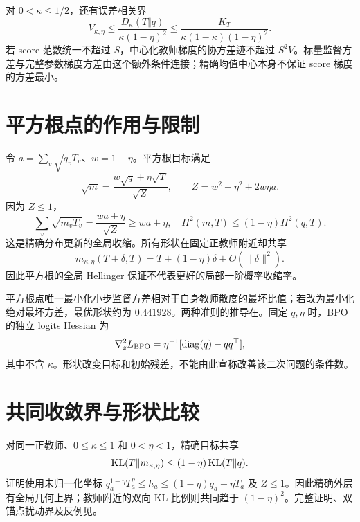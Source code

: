 对 $0<\kappa\le1/2$，还有误差相关界
\begin{equation}
V_{\kappa,\eta}
\le\frac{D_\kappa(T\Vert q)}{\kappa(1-\eta)^2}
\le\frac{K_T}{\kappa(1-\kappa)(1-\eta)^2}.
\label{eq:error-variance-main}
\end{equation}
若 score 范数统一不超过 $S$，中心化教师梯度的协方差迹不超过 $S^2V$。标量监督方差与完整参数梯度方差由这个额外条件连接；精确均值中心本身不保证 score 梯度的方差最小。

\section{平方根点的作用与限制}
令 $a=\sum_v\sqrt{q_vT_v}$、$w=1-\eta$。平方根目标满足
\begin{equation}
\sqrt m=\frac{w\sqrt q+\eta\sqrt T}{\sqrt Z},\qquad
Z=w^2+\eta^2+2w\eta a.
\end{equation}
因为 $Z\le1$，
\begin{equation}
\sum_v\sqrt{m_vT_v}=\frac{wa+\eta}{\sqrt Z}\ge wa+\eta,
\quad
H^2(m,T)\le(1-\eta)H^2(q,T).
\label{eq:hellinger-contraction-main}
\end{equation}
这是精确分布更新的全局收缩。所有形状在固定正教师附近却共享
\begin{equation}
m_{\kappa,\eta}(T+\delta,T)
=T+(1-\eta)\delta+O(\|\delta\|^2).
\label{eq:local-rate-main}
\end{equation}
因此平方根的全局 Hellinger 保证不代表更好的局部一阶概率收缩率。

平方根点唯一最小化小步监督方差相对于自身教师散度的最坏比值；若改为最小化绝对最坏方差，最优形状约为 $0.441928$。两种准则的推导在。固定 $q,\eta$ 时，BPO 的独立 logits Hessian 为
\begin{equation}
\nabla_z^2L_{\rm BPO}=\eta^{-1}[\operatorname{diag}(q)-qq^\top],
\end{equation}
其中不含 $\kappa$。形状改变目标和初始残差，不能由此宣称改善该二次问题的条件数。

\section{共同收敛界与形状比较}
对同一正教师、$0\le\kappa\le1$ 和 $0<\eta<1$，精确目标共享
\begin{equation}
\operatorname{KL}(T\Vert m_{\kappa,\eta})\le(1-\eta)\operatorname{KL}(T\Vert q).
\label{eq:forward-kl-main}
\end{equation}
证明使用未归一化坐标 $q_a^{1-\eta}T_a^\eta\le h_a\le(1-\eta)q_a+\eta T_a$ 及 $Z\le1$。因此精确外层有全局几何上界；教师附近的双向 KL 比例则共同趋于 $(1-\eta)^2$。完整证明、双锚点扰动界及反例见。

